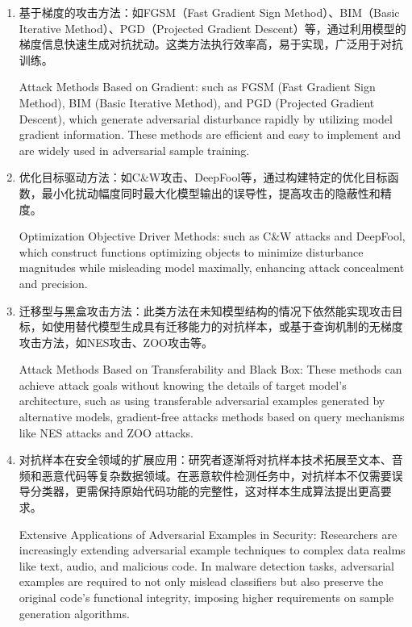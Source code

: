 \begin{enumerate} [label=\arabic*)] 
\item 基于梯度的攻击方法：如FGSM\cite{lupart2023study}（Fast Gradient Sign Method）、BIM\cite{kurakin2016adversarial}（Basic Iterative Method）、PGD\cite{bryniarski2021evading}（Projected Gradient Descent）等，通过利用模型的梯度信息快速生成对抗扰动。这类方法执行效率高，易于实现，广泛用于对抗训练。

Attack Methods Based on Gradient: such as FGSM\cite{lupart2023study} (Fast Gradient Sign Method), BIM\cite{kurakin2016adversarial} (Basic Iterative Method), and PGD\cite{bryniarski2021evading} (Projected Gradient Descent), which generate adversarial disturbance rapidly by utilizing model gradient information. These methods are efficient and easy to implement and are widely used in adversarial sample training.
\item 优化目标驱动方法：如C\&W攻击\cite{carlini2017towards}、DeepFool\cite{moosavi2016deepfool}等，通过构建特定的优化目标函数，最小化扰动幅度同时最大化模型输出的误导性，提高攻击的隐蔽性和精度。

    Optimization Objective Driver Methods: such as C\&W attacks\cite{carlini2017towards} and DeepFool\cite{moosavi2016deepfool}, which construct functions optimizing objects to minimize disturbance magnitudes while misleading model maximally, enhancing attack concealment and precision.
\item 迁移型与黑盒攻击方法：此类方法在未知模型结构的情况下依然能实现攻击目标，如使用替代模型生成具有迁移能力的对抗样本，或基于查询机制的无梯度攻击方法，如NES攻击\cite{ilyas2017query}、ZOO攻击\cite{chen2017zoo}等。

Attack Methods Based on Transferability and Black Box: These methods can achieve attack goals without knowing the details of target model’s architecture, such as using transferable adversarial examples generated by alternative models, gradient-free attacks methods based on query mechanisms like NES attacks\cite{ilyas2017query} and ZOO attacks\cite{chen2017zoo}.
\item 对抗样本在安全领域的扩展应用：研究者逐渐将对抗样本技术拓展至文本、音频和恶意代码等复杂数据领域。在恶意软件检测任务中，对抗样本不仅需要误导分类器，更需保持原始代码功能的完整性，这对样本生成算法提出更高要求。

Extensive Applications of Adversarial Examples in Security: Researchers are increasingly extending adversarial example techniques to complex data realms like text, audio, and malicious code. In malware detection tasks, adversarial examples are required to not only mislead classifiers but also preserve the original code’s functional integrity, imposing higher requirements on sample generation algorithms.
\end{enumerate}

